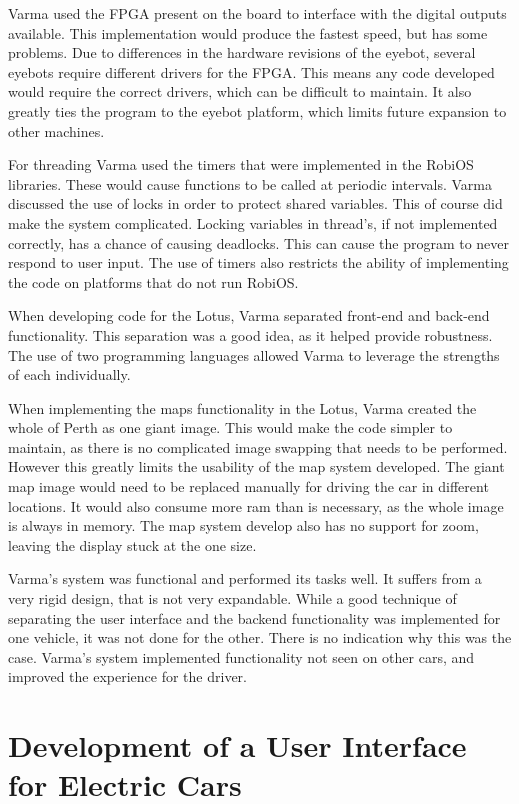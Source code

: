 Varma used the FPGA present on the board to interface with the digital outputs available. This implementation would produce the fastest speed, but has some problems. Due to differences in the hardware revisions of the eyebot, several eyebots require different drivers for the FPGA. This means any code developed would require the correct drivers, which can be difficult to maintain. It also greatly ties the program to the eyebot platform, which limits future expansion to other machines.

For threading Varma used the timers that were implemented in the RobiOS libraries. These would cause functions to be called at periodic intervals. Varma discussed the use of locks in order to protect shared variables. This of course did make the system complicated. Locking variables in thread's, if not implemented correctly, has a chance of causing deadlocks. This can cause the program to never respond to user input. The use of timers also restricts the ability of implementing the code on platforms that do not run RobiOS.

When developing code for the Lotus, Varma separated front-end and back-end functionality. This separation was a good idea, as it helped provide robustness. The use of two programming languages allowed Varma to leverage the strengths of each individually.

When implementing the maps functionality in the Lotus, Varma created the whole of Perth as one giant image. This would make the code simpler to maintain, as there is no complicated image swapping that needs to be performed. However this greatly limits the usability of the map system developed. The giant map image would need to be replaced manually for driving the car in different locations. It would also consume more ram than is necessary, as the whole image is always in memory. The map system develop also has no support for zoom, leaving the display stuck at the one size.

Varma's system was functional and performed its tasks well. It suffers from a very rigid design, that is not very expandable. While a good technique of separating the user interface and the backend functionality was implemented for one vehicle, it was not done for the other. There is no indication why this was the case. Varma's system implemented functionality not seen on other cars, and improved the experience for the driver.

\section{Development of a User Interface
for Electric Cars}

